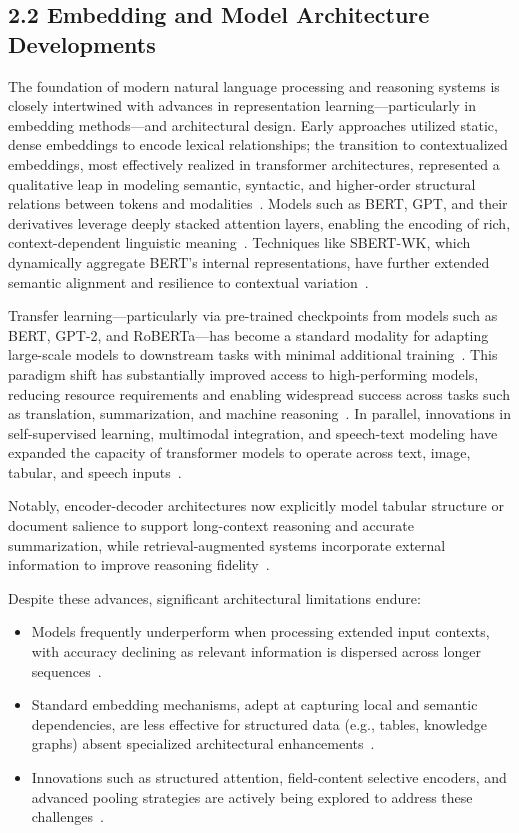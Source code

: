 \documentclass[11pt]{article}
\begin{document}
\subsection{2.2 Embedding and Model Architecture Developments}

The foundation of modern natural language processing and reasoning systems is closely intertwined with advances in representation learning—particularly in embedding methods—and architectural design. Early approaches utilized static, dense embeddings to encode lexical relationships; the transition to contextualized embeddings, most effectively realized in transformer architectures, represented a qualitative leap in modeling semantic, syntactic, and higher-order structural relations between tokens and modalities~\cite{ref72,ref74,ref75,ref77}. Models such as BERT, GPT, and their derivatives leverage deeply stacked attention layers, enabling the encoding of rich, context-dependent linguistic meaning~\cite{ref100}. Techniques like SBERT-WK, which dynamically aggregate BERT’s internal representations, have further extended semantic alignment and resilience to contextual variation~\cite{ref74,ref75}.

Transfer learning—particularly via pre-trained checkpoints from models such as BERT, GPT-2, and RoBERTa—has become a standard modality for adapting large-scale models to downstream tasks with minimal additional training~\cite{ref100}. This paradigm shift has substantially improved access to high-performing models, reducing resource requirements and enabling widespread success across tasks such as translation, summarization, and machine reasoning~\cite{ref100}. In parallel, innovations in self-supervised learning, multimodal integration, and speech-text modeling have expanded the capacity of transformer models to operate across text, image, tabular, and speech inputs~\cite{ref72,ref77}.

Notably, encoder-decoder architectures now explicitly model tabular structure or document salience to support long-context reasoning and accurate summarization, while retrieval-augmented systems incorporate external information to improve reasoning fidelity~\cite{ref75,ref77,ref100}. 

Despite these advances, significant architectural limitations endure:

\begin{itemize}
    \item Models frequently underperform when processing extended input contexts, with accuracy declining as relevant information is dispersed across longer sequences~\cite{ref70}.
    \item Standard embedding mechanisms, adept at capturing local and semantic dependencies, are less effective for structured data (e.g., tables, knowledge graphs) absent specialized architectural enhancements~\cite{ref77,ref100}.
    \item Innovations such as structured attention, field-content selective encoders, and advanced pooling strategies are actively being explored to address these challenges~\cite{ref74,ref75,ref77,ref100}.
\end{itemize}
\end{document}
